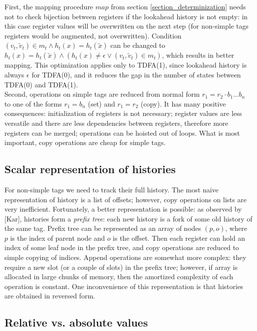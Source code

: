 \documentclass{article}
\newcommand{\Xin}{\!\in\!}
\newcommand{\Xeq}{\!=\!}
\theoremstyle{definition}
\begin{document}
\begin{multicols}{2}
First, the mapping procedure $map$ from section \ref{section_determinization}
needs not to check bijection between registers if the lookahead history is not empty:
in this case register values will be overwritten on the next step
(for non-simple tags registers would be augmented, not overwritten).
Condition $(v_t, \widetilde{v}_t) \Xin m_t \wedge h_t(x) \Xeq h_t(\widetilde{x})$
can be changed to $h_t(x) \Xeq h_t(\widetilde{x}) \wedge (h_t(x) \!\neq\! \epsilon \vee (v_t, \widetilde{v}_t) \Xin m_t)$,
which results in better mapping.
This optimization applies only to TDFA(1), since lookahead history is always $\epsilon$ for TDFA(0),
and it reduces the gap in the number of states between TDFA(0) and TDFA(1).
\\

Second, operations on simple tags are reduced from normal form $r_1 \Xeq r_2 \cdot b_1 \dots b_n$
to one of the forms $r_1 \Xeq b_n$ (set) and $r_1 \Xeq r_2$ (copy).
It has many positive consequences:
initialization of registers is not necessary;
register values are less versatile and there are less dependencies between registers, therefore more registers can be merged;
operations can be hoisted out of loops.
What is most important, copy operations are cheap for simple tags.

\subsection*{Scalar representation of histories}

For non-simple tags we need to track their full history.
The most naive representation of history is a list of offsets;
however, copy operations on lists are very inefficient.
Fortunately, a better representation is possible: as observed by [Kar], histories form a \emph{prefix tree}:
each new history is a fork of some old history of the same tag.
Prefix tree can be represented as an array of nodes $(p, o)$,
where $p$ is the index of parent node and $o$ is the offset.
Then each register can hold an index of some leaf node in the prefix tree,
and copy operations are reduced to simple copying of indices.
Append operations are somewhat more complex: they require a new slot (or a couple of slots) in the prefix tree;
however, if array is allocated in large chunks of memory,
then the amortized complexity of each operation is constant.
One inconvenience of this representation is that histories are obtained in reversed form.

\subsection*{Relative vs. absolute values}


\end{multicols}
\end{document}
